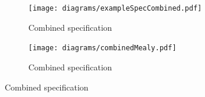 \begin{figure}
\centering
\begin{subfigure}[t]{0.47\textwidth}
\texttt{[image: diagrams/exampleSpecCombined.pdf]}
\caption{Combined specification}
\label{fig:combined_spec}
\end{subfigure}
\hfill
\begin{subfigure}[t]{0.47\textwidth}
\texttt{[image: diagrams/combinedMealy.pdf]}
\caption{Combined specification}
\label{fig:combined_spec_mealy}
\end{subfigure}
\end{figure}

